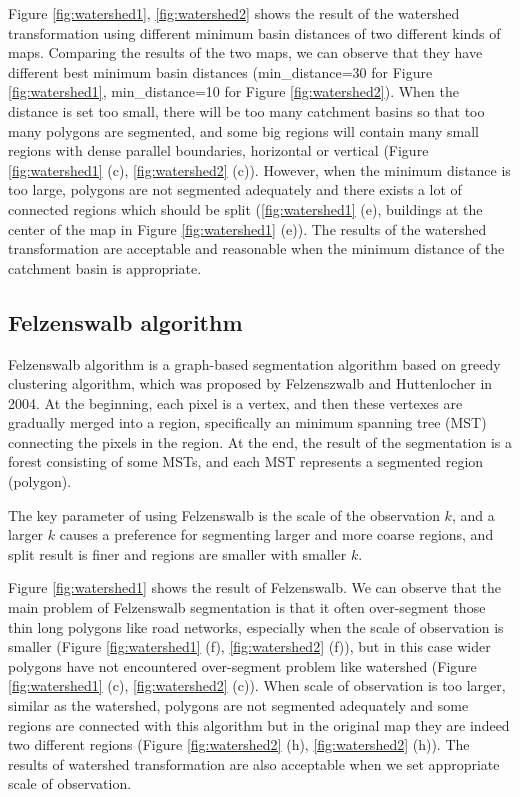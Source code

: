 \documentclass[12pt]{article}
\begin{document}
Figure \ref{fig:watershed1}, \ref{fig:watershed2} shows the result of the watershed transformation using different minimum basin distances of two different kinds of maps. Comparing the results of the two maps, we can observe that they have different best minimum basin distances (min\_distance=30 for Figure \ref{fig:watershed1}, min\_distance=10 for Figure \ref{fig:watershed2}). When the distance is set too small, there will be too many catchment basins so that too many polygons are segmented, and some big regions will contain many small regions with dense parallel boundaries, horizontal or vertical (Figure \ref{fig:watershed1} (c), \ref{fig:watershed2} (c)). However, when the minimum distance is too large, polygons are not segmented adequately and there exists a lot of connected regions which should be split (\ref{fig:watershed1} (e), buildings at the center of the map in Figure \ref{fig:watershed1} (e)). The results of the watershed transformation are acceptable and reasonable when the minimum distance of the catchment basin is appropriate.


\subsection{Felzenswalb algorithm}

Felzenswalb algorithm is a graph-based segmentation algorithm based on greedy clustering algorithm, which was proposed by Felzenszwalb and Huttenlocher in 2004\cite{felzenszwalb2004efficient}. At the beginning, each pixel is a vertex, and then these vertexes are gradually merged into a region, specifically an minimum spanning tree (MST) connecting the pixels in the region\cite{boykov2006graph}. At the end, the result of the segmentation is a forest consisting of some MSTs, and each MST represents a segmented region (polygon).

The key parameter of using Felzenswalb is the scale of the observation $k$, and a larger $k$ causes a preference for segmenting larger and more coarse regions, and split result is finer and regions are smaller with smaller $k$.  

Figure \ref{fig:watershed1} shows the result of Felzenswalb. We can observe that the main problem of Felzenswalb segmentation is that it often over-segment those thin long polygons like road networks, especially when the scale of observation is smaller (Figure \ref{fig:watershed1} (f), \ref{fig:watershed2} (f)), but in this case wider polygons have not encountered over-segment problem like watershed (Figure \ref{fig:watershed1} (c), \ref{fig:watershed2} (c)). When scale of observation is too larger, similar as the watershed, polygons are not segmented adequately and some regions are connected with this algorithm but in the original map they are indeed two different regions (Figure \ref{fig:watershed2} (h), \ref{fig:watershed2} (h)). The results of watershed transformation are also acceptable when we set appropriate scale of observation.
\end{document}
